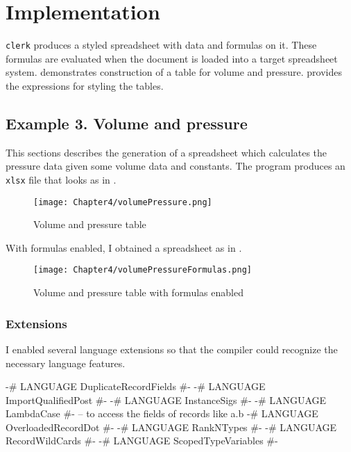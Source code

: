 \chapter{Implementation}
\label{chap:impl}


\texttt{clerk} produces a styled spreadsheet with data and formulas on it. These formulas are evaluated when the document is loaded into a target spreadsheet system.
 demonstrates construction of a table for volume and pressure.  provides the expressions for styling the tables.

\section{Example 3. Volume and pressure}
\label{sec:ex3}

This sections describes the generation of a spreadsheet which calculates the pressure data given some volume data and constants. The program produces an \texttt{xlsx} file that looks as in .

\begin{figure}[h]
  \centering
  \texttt{[image: Chapter4/volumePressure.png]}
  \caption{Volume and pressure table}
  \label{fig:volumePressure}
\end{figure}

With formulas enabled, I obtained a spreadsheet as in .

\begin{figure}[h]
  \centering
  \texttt{[image: Chapter4/volumePressureFormulas.png]}
  \caption{Volume and pressure table with formulas enabled}
  \label{fig:volumePressureFormulas}
\end{figure}

\subsection{Extensions}

I enabled several language extensions so that the compiler could recognize the necessary language features.


\begin{mycode}
{-# LANGUAGE DuplicateRecordFields #-}
{-# LANGUAGE ImportQualifiedPost #-}
{-# LANGUAGE InstanceSigs #-}
{-# LANGUAGE LambdaCase #-}
-- to access the fields of records like a.b
{-# LANGUAGE OverloadedRecordDot #-}
{-# LANGUAGE RankNTypes #-}
{-# LANGUAGE RecordWildCards #-}
{-# LANGUAGE ScopedTypeVariables #-}
\end{mycode}


